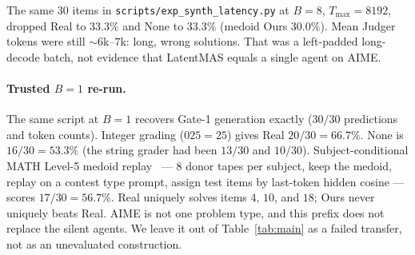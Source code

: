 \documentclass[11pt]{article}
\begin{document}
The same $30$ items in \texttt{scripts/exp\_synth\_latency.py} at
$B{=}8$, $T_{\max}{=}8192$, dropped Real to $33.3\%$ and None to
$33.3\%$ (medoid Ours $30.0\%$).
Mean Judger tokens were still ${\sim}6$k--$7$k: long, wrong solutions.
That was a left-padded long-decode batch, not evidence that LatentMAS
equals a single agent on AIME.

\paragraph{Trusted $B{=}1$ re-run.}
The same script at $B{=}1$ recovers Gate-1 generation exactly
($30/30$ predictions and token counts).
Integer grading ($025{=}25$) gives Real \textbf{$20/30=66.7\%$}.
None is $16/30=53.3\%$ (the string grader had been $13/30$ and $10/30$).
Subject-conditional MATH Level-5 medoid replay~\citep{hendrycks2021math}
--- $8$ donor tapes per subject, keep the medoid, replay on a contest
type prompt, assign test items by last-token hidden cosine --- scores
$17/30=56.7\%$.
Real uniquely solves items $4$, $10$, and $18$; Ours never uniquely
beats Real.
AIME is not one problem type, and this prefix does not replace the
silent agents.
We leave it out of Table~\ref{tab:main} as a failed transfer, not as
an unevaluated construction.
\end{document}
